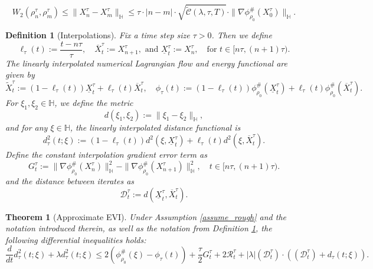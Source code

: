 \documentclass[10pt,a4paper]{amsart}
\newtheorem{definition}{Definition}
\newtheorem{theorem}{Theorem}
\begin{document}
\begin{equation}
    W_2(\rho_n^{\tau},\rho_m^{\tau}) 
    \leq \|X^{\tau}_{n}-X^{\tau}_m\|_{\mathbb{H}} 
    \leq    \tau \cdot |n-m| \cdot \sqrt{\tilde{\mathcal{C}}(\lambda,\tau,T)}  \cdot \|\nabla \phi^{\#}_{\rho_0}(X^{\tau}_0)\|_{\mathbb{H}}.
    \label{lipschitz_bound}
\end{equation}

\begin{definition}[Interpolations] \label{interpolations_usual}
Fix a time step size $\tau > 0$. Then we define
\[
\ell_{\tau}(t) := \frac{t - n\tau}{\tau}, \quad
\overline{X}^{\tau}_t := X^{\tau}_{n+1},  \text{ and }
\underline{X}^{\tau}_t := X^{\tau}_n, \quad \text{for } t \in [n\tau,(n+1)\tau).
\]
The linearly interpolated numerical Lagrangian flow and energy functional are given by
\[
\tilde{X}^{\tau}_t := (1 - \ell_{\tau}(t)) \underline{X}^{\tau}_t + \ell_{\tau}(t) \overline{X}^{\tau}_t, \quad
\phi_{\tau}(t) := (1 - \ell_{\tau}(t)) \phi^{\#}_{\rho_0}(\underline{X}^{\tau}_t) 
+ \ell_{\tau}(t) \phi^{\#}_{\rho_0}(\overline{X}^{\tau}_t).
\]
For $\xi_1,\xi_2 \in \mathbb{H}$, we define the metric
\[
d(\xi_1, \xi_2) := \|\xi_1 - \xi_2\|_{\mathbb{H}},
\]
and for any $\xi \in \mathbb{H}$, the linearly interpolated distance functional is
\[
d^2_{\tau}(t;\xi) := 
(1 - \ell_{\tau}(t)) d^2(\xi, \underline{X}^{\tau}_t) 
+ \ell_{\tau}(t) d^2(\xi, \overline{X}^{\tau}_t).
\] 
Define the constant interpolation gradient error term as
\[
G^{\tau}_t := \|\nabla \phi^{\#}_{\rho_0}(X^{\tau}_n)\|^2_{\mathbb{H}} - \|\nabla \phi^{\#}_{\rho_0}(X^{\tau}_{n+1})\|^2_{\mathbb{H}}, \quad t \in [n\tau,(n+1)\tau).
\] and the distance between iterates as
\[
\mathcal{D}_{t}^{\tau} := d(\underline{X}^{\tau}_t,\overline{X}^{\tau}_t).
\]
\end{definition}

\begin{theorem}[Approximate EVI] \label{differential_inequality_thm}
Under Assumption \ref{assume_rough} and the notation introduced therein, as well as the notation from Definition \ref{interpolations_usual}, the following differential inequalities holds: 
\begin{equation}
   \frac{d}{dt} d^2_{\tau}(t;\xi) + \lambda d^2_{\tau}(t;\xi) 
    \leq  2(\phi^{\#}_{\rho_0}(\xi) - \phi_{\tau}(t)) + \frac{\tau}{2} G^{\tau}_t + 2\mathcal{R}_t^{\tau} + |\lambda|  (\mathcal{D}_t^{\tau}) \cdot((\mathcal{D}_t^{\tau}) + d_{\tau}(t;\xi)).
\end{equation}
\end{theorem}
\end{document}
